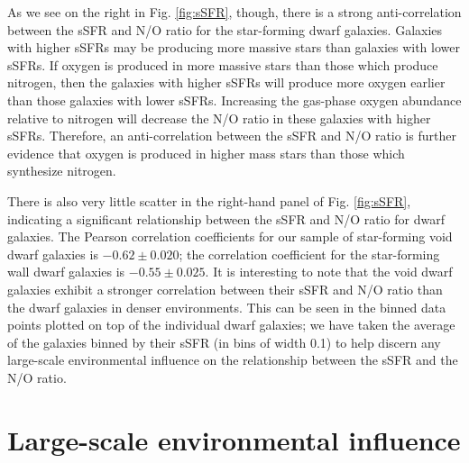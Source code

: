 As we see on the right in Fig. \ref{fig:sSFR}, though, there is a strong 
anti-correlation between the sSFR and N/O ratio for the star-forming dwarf 
galaxies.  Galaxies with higher sSFRs may be producing more massive stars than 
galaxies with lower sSFRs.  If oxygen is produced in more massive stars than 
those which produce nitrogen, then the galaxies with higher sSFRs will produce 
more oxygen earlier than those galaxies with lower sSFRs.  Increasing the 
gas-phase oxygen abundance relative to nitrogen will decrease the N/O ratio in 
these galaxies with higher sSFRs.  Therefore, an anti-correlation between the 
sSFR and N/O ratio is further evidence that oxygen is produced in higher mass 
stars than those which synthesize nitrogen.

There is also very little scatter in the right-hand panel of Fig. 
\ref{fig:sSFR}, indicating a significant relationship between the sSFR and N/O 
ratio for dwarf galaxies.  The Pearson correlation coefficients for our sample 
of star-forming void dwarf galaxies is $-0.62\pm 0.020$; the correlation 
coefficient for the star-forming wall dwarf galaxies is $-0.55\pm 0.025$.  It is 
interesting to note that the void dwarf galaxies exhibit a stronger correlation 
between their sSFR and N/O ratio than the dwarf galaxies in denser environments.  
This can be seen in the binned data points plotted on top of the individual 
dwarf galaxies; we have taken the average of the galaxies binned by their sSFR 
(in bins of width 0.1) to help discern any large-scale environmental influence 
on the relationship between the sSFR and the N/O ratio.



%
%
\section{Large-scale environmental influence}


